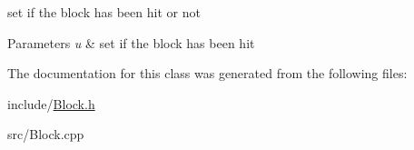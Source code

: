 set if the block has been hit or not 


\begin{DoxyParams}{Parameters}
{\em u} & set if the block has been hit \\
\hline
\end{DoxyParams}


The documentation for this class was generated from the following files\-:\begin{DoxyCompactItemize}
\item 
include/\hyperlink{_block_8h}{Block.\-h}\item 
src/Block.\-cpp\end{DoxyCompactItemize}
